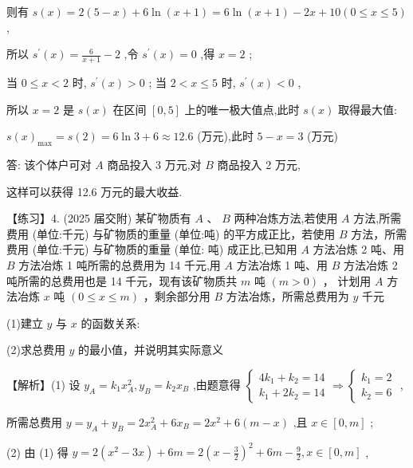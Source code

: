 \documentclass[10pt]{article}
\begin{document}
则有 \(s\left( x\right)  = 2\left( {5 - x}\right)  + 6\ln \left( {x + 1}\right)  = 6\ln \left( {x + 1}\right)  - {2x} + {10}\left( {0 \leq  x \leq  5}\right)\) ,

所以 \({s}^{\prime }\left( x\right)  = \frac{6}{x + 1} - 2\) ,令 \({s}^{\prime }\left( x\right)  = 0\) ,得 \(x = 2\) ;

当 \(0 \leq  x < 2\) 时, \({s}^{\prime }\left( x\right)  > 0\) ; 当 \(2 < x \leq  5\) 时, \({s}^{\prime }\left( x\right)  < 0\) ,

所以 \(x = 2\) 是 \(s\left( x\right)\) 在区间 \(\left\lbrack  {0,5}\right\rbrack\) 上的唯一极大值点,此时 \(s\left( x\right)\) 取得最大值:

\(s{\left( x\right) }_{\max } = s\left( 2\right)  = 6\ln 3 + 6 \approx  {12.6}\) (万元),此时 \(5 - x = 3\) (万元)

答: 该个体户可对 \(A\) 商品投入 3 万元,对 \(B\) 商品投入 2 万元,

这样可以获得 12.6 万元的最大收益.

【练习】4. (2025 届交附) 某矿物质有 \(A\text{ 、 }B\) 两种冶炼方法,若使用 \(A\) 方法,所需费用 (单位:千元) 与矿物质的重量 (单位:吨) 的平方成正比，若使用 \(B\) 方法，所需费用 (单位:千元) 与矿物质的重量 (单位: 吨) 成正比,已知用 \(A\) 方法冶炼 2 吨、用 \(B\) 方法冶炼 1 吨所需的总费用为 14 千元,用 \(A\) 方法冶炼 1 吨、用 \(B\) 方法冶炼 2 吨所需的总费用也是 14 千元，现有该矿物质共 \(m\) 吨 \(\left( {m > 0}\right)\) ， 计划用 \(A\) 方法冶炼 \(x\) 吨 \(\left( {0 \leq  x \leq  m}\right)\) ，剩余部分用 \(B\) 方法冶炼，所需总费用为 \(y\) 千元

(1)建立 \(y\) 与 \(x\) 的函数关系:

(2)求总费用 \(y\) 的最小值，并说明其实际意义

【解析】(1) 设 \({y}_{A} = {k}_{1}{x}_{A}^{2},{y}_{B} = {k}_{2}{x}_{B}\) ,由题意得 \(\left\{  {\begin{array}{l} 4{k}_{1} + {k}_{2} = {14} \\  {k}_{1} + 2{k}_{2} = {14} \end{array} \Rightarrow  \left\{  \begin{array}{l} {k}_{1} = 2 \\  {k}_{2} = 6 \end{array}\right. }\right.\) ,

所需总费用 \(y = {y}_{A} + {y}_{B} = 2{x}_{A}^{2} + 6{x}_{B} = 2{x}^{2} + 6\left( {m - x}\right)\) ,且 \(x \in  \left\lbrack  {0,m}\right\rbrack\) ;

(2) 由 (1) 得 \(y = 2\left( {{x}^{2} - {3x}}\right)  + {6m} = 2{\left( x - \frac{3}{2}\right) }^{2} + {6m} - \frac{9}{2},x \in  \left\lbrack  {0,m}\right\rbrack\) ,
\end{document}
